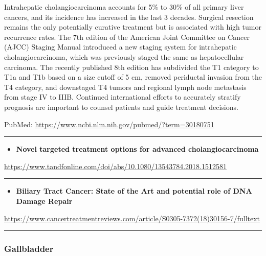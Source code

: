 \documentclass[]{article}
\providecommand{\tightlist}{%
  \setlength{\itemsep}{0pt}\setlength{\parskip}{0pt}}
\begin{document}
Intrahepatic cholangiocarcinoma accounts for 5\% to 30\% of all primary
liver cancers, and its incidence has increased in the last 3 decades.
Surgical resection remains the only potentially curative treatment but
is associated with high tumor recurrence rates. The 7th edition of the
American Joint Committee on Cancer (AJCC) Staging Manual introduced a
new staging system for intrahepatic cholangiocarcinoma, which was
previously staged the same as hepatocellular carcinoma. The recently
published 8th edition has subdivided the T1 category to T1a and T1b
based on a size cutoff of 5 cm, removed periductal invasion from the T4
category, and downstaged T4 tumors and regional lymph node metastasis
from stage IV to IIIB. Continued international efforts to accurately
stratify prognosis are important to counsel patients and guide treatment
decisions.

PubMed: \url{https://www.ncbi.nlm.nih.gov/pubmed/?term=30180751}

{}

{}

\begin{center}\rule{0.5\linewidth}{\linethickness}\end{center}

\begin{itemize}
\tightlist
\item
  \textbf{Novel targeted treatment options for advanced
  cholangiocarcinoma}
\end{itemize}

\url{https://www.tandfonline.com/doi/abs/10.1080/13543784.2018.1512581}

\begin{center}\rule{0.5\linewidth}{\linethickness}\end{center}

\begin{itemize}
\tightlist
\item
  \textbf{Biliary Tract Cancer: State of the Art and potential role of
  DNA Damage Repair}
\end{itemize}

\url{https://www.cancertreatmentreviews.com/article/S0305-7372(18)30156-7/fulltext}

\begin{center}\rule{0.5\linewidth}{\linethickness}\end{center}

\hypertarget{gallbladder-3}{%
\subsubsection{Gallbladder}\label{gallbladder-3}}
\end{document}
